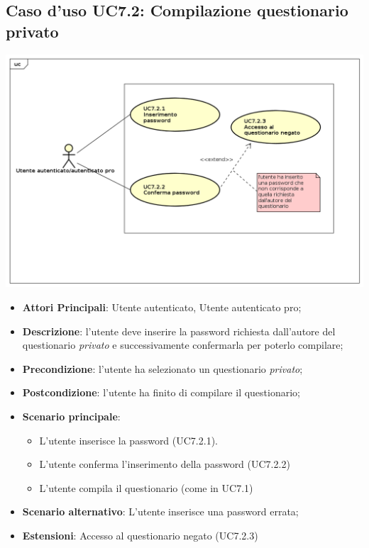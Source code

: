 \subsection{Caso d'uso UC7.2: Compilazione questionario privato}
\begin{center}
\includegraphics[scale=0.5]{UML/UC7_2.png}
\end{center}
\begin{itemize}
\item\textbf{Attori Principali}: Utente autenticato, Utente autenticato pro;
\item\textbf{Descrizione}: l'utente deve inserire la password richiesta dall'autore del questionario \textit{privato} e successivamente confermarla per poterlo compilare;
\item\textbf{Precondizione}: l'utente ha selezionato un questionario \textit{privato};
\item\textbf{Postcondizione}: l'utente ha finito di compilare il questionario;
\item\textbf{Scenario principale}:
\begin{itemize}
\item L'utente inserisce la password (UC7.2.1).
\item L'utente conferma l'inserimento della password (UC7.2.2)
\item L'utente compila il questionario (come in UC7.1)
\end{itemize}
\item\textbf{Scenario alternativo}: L'utente inserisce una password errata;
\item\textbf{Estensioni}: Accesso al questionario negato (UC7.2.3)
\end{itemize}

